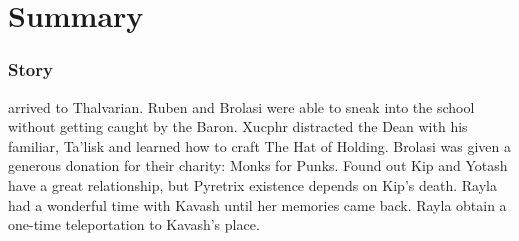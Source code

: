 \part*{Summary}
\section{Story}
 arrived to Thalvarian.
Ruben and Brolasi were able to sneak into the school without getting caught by the Baron.
Xucphr distracted the Dean with his familiar, Ta'lisk and learned how to craft The Hat of Holding.
Brolasi was given a generous donation for their charity: Monks for Punks.
Found out Kip and Yotash have a great relationship, but Pyretrix existence depends on Kip's death.
Rayla had a wonderful time with Kavash until her memories came back.
Rayla obtain a one-time teleportation to Kavash's place.
